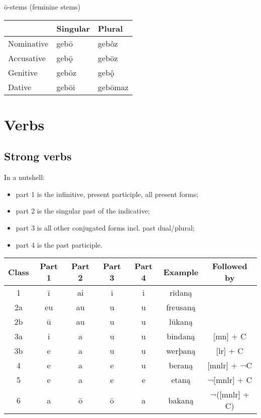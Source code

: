 \documentclass{article}
\newcommand\oon{ǫ̂}
\begin{document}
ō-stems (feminine stems)

\begin{center}
\begin{tabular}{ | l | l l | }
\hline
& Singular & Plural \\
\hline
Nominative & gebō & gebôz \\
Accusative & gebǭ & gebōz \\
Genitive & gebōz & geb\oon \\
Dative & gebōi & gebōmaz \\
\hline
\end{tabular}
\end{center}

\section{Verbs}

\subsection{Strong verbs}

In a nutshell:

\begin{itemize}
\item{part 1 is the infinitive, present participle, all present forms;}
\item{part 2 is the singular past of the indicative;}
\item{part 3 is all other conjugated forms incl. past dual/plural;}
\item{part 4 is the past participle.}
\end{itemize}

\begin{center}
\begin{tabular}{ | c | c c c c c c |}
\hline
Class & Part 1 & Part 2 & Part 3 & Part 4 & Example & Followed by \\
\hline
1  & ī  & ai & i  & i  & rīdaną   & \\
2a & eu & au & u  & u  & freusaną & \\
2b & ū  & au & u  & u  & lūkaną   & \\
3a & i  & a  & u  & u  & bindaną  & [mn] + C \\
3b & e  & a  & u  & u  & werþaną  & [lr] + C \\
4  & e  & a  & e  & u  & beraną   & [mnlr] + ¬C \\
5  & e  & a  & e  & e  & etaną    & ¬[mnlr] + C \\
6  & a  & ō  & ō  & a  & bakaną   & ¬([mnlr] + C) \\
\hline
\end{tabular}
\end{center}
\end{document}
